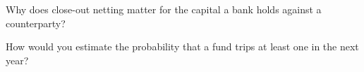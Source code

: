 \begin{interviewq}\label{iq:fm:legal-documentation:5}
Why does close-out netting matter for the capital a bank holds against a counterparty?
\end{interviewq}

\begin{interviewq}\label{iq:fm:legal-documentation:6}
How would you estimate the probability that a fund trips at least one  in the next year?
\end{interviewq}
